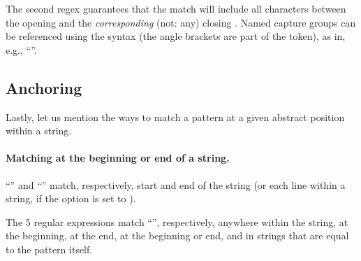 \documentclass[nojss]{jss}
\begin{document}

The second regex guarantees that the match will include all characters
between the opening  and the \textit{corresponding} (not: any)
closing .
Named capture groups can be referenced using the
 syntax
(the angle brackets are part of the token), as in, e.g.,
``''.





\subsection{Anchoring}

Lastly, let us mention the ways to match a pattern
at a given abstract position within a string.

\paragraph{Matching at the beginning or end of a string.}
``\code{\^{}}'' and ``\code{\$}''  match, respectively,
start and end of the string
(or each line within a string, if the  option is set to ).

\begin{Schunk}
\end{Schunk}

The 5 regular expressions match ``'', respectively,
anywhere within the string, at the beginning,
at the end, at the beginning or end,
and in strings that are equal to the pattern itself.
\end{document}
